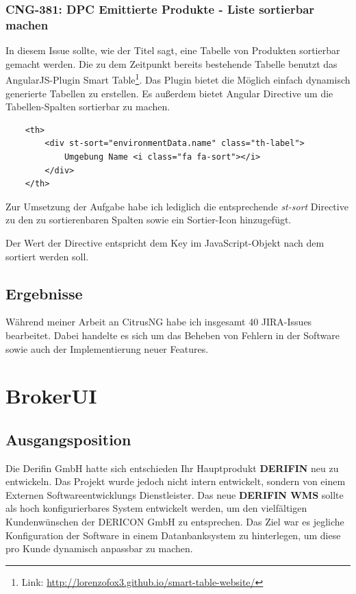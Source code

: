 \documentclass[chapterprefix=false, 12pt, a4paper, oneside, parskip=half, listof=totoc, bibliography=totoc, numbers=noendperiod]{scrbook}
\begin{document}
    \subsubsection{CNG-381: DPC Emittierte Produkte - Liste sortierbar machen}

    In diesem Issue sollte, wie der Titel sagt, eine Tabelle von Produkten sortierbar gemacht werden.
    Die zu dem Zeitpunkt bereits bestehende Tabelle benutzt das AngularJS-Plugin Smart Table\footnote{Link: \url{http://lorenzofox3.github.io/smart-table-website/}}.
    Das Plugin bietet die Möglich einfach dynamisch generierte Tabellen zu erstellen. Es außerdem bietet Angular Directive um die Tabellen-Spalten sortierbar zu machen.

    \begin{verbatim}
    <th>
        <div st-sort="environmentData.name" class="th-label">
            Umgebung Name <i class="fa fa-sort"></i>
        </div>
    </th>
    \end{verbatim}

    Zur Umsetzung der Aufgabe habe ich lediglich die entsprechende \textit{st-sort} Directive zu den zu sortierenbaren
    Spalten sowie ein Sortier-Icon hinzugefügt.

    \pagebreak

    Der Wert der Directive entspricht dem Key im JavaScript-Objekt nach dem
    sortiert werden soll.

    \subsection{Ergebnisse}

    Während meiner Arbeit an CitrusNG habe ich insgesamt 40 JIRA-Issues bearbeitet. Dabei handelte
    es sich um das Beheben von Fehlern in der Software sowie auch der Implementierung neuer Features.

    \section{BrokerUI}

    \subsection{Ausgangsposition}

    Die Derifin GmbH hatte sich entschieden Ihr Hauptprodukt \textbf{DERIFIN} neu zu entwickeln.
    Das Projekt wurde jedoch nicht intern entwickelt, sondern von einem Externen Softwareentwicklungs Dienstleister.
    Das neue \textbf{DERIFIN WMS} sollte als hoch konfigurierbares System entwickelt werden, um den vielfältigen
    Kundenwünschen der DERICON GmbH zu entsprechen. Das Ziel war es jegliche Konfiguration der Software in einem
    Datanbanksystem zu hinterlegen, um diese pro Kunde dynamisch anpassbar zu machen.
\end{document}
